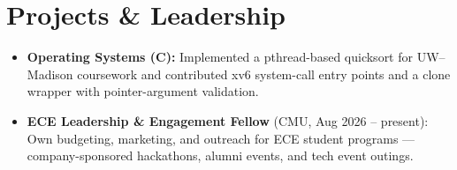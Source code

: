 \documentclass[11pt, letterpaper]{article}
\begin{document}
\section{Projects \& Leadership}
\begin{itemize}
  \item \textbf{Operating Systems (C):} Implemented a pthread-based quicksort for UW--Madison coursework and contributed xv6 system-call entry points and a clone wrapper with pointer-argument validation.
  \item \textbf{ECE Leadership \& Engagement Fellow} (CMU, Aug 2026 -- present): Own budgeting, marketing, and outreach for ECE student programs --- company-sponsored hackathons, alumni events, and tech event outings.
\end{itemize}
\end{document}
